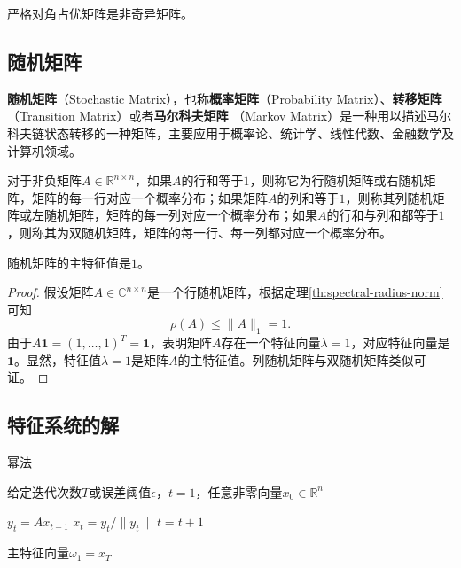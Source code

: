 \begin{theorem}
严格对角占优矩阵是非奇异矩阵。
\end{theorem}

\subsection{随机矩阵}
\textbf{随机矩阵}（Stochastic Matrix），也称\textbf{概率矩阵}（Probability Matrix）、\textbf{转移矩阵}（Transition Matrix）或者\textbf{马尔科夫矩阵}
（Markov Matrix）是一种用以描述马尔科夫链状态转移的一种矩阵，主要应用于概率论、统计学、线性代数、金融数学及计算机领域。

\begin{definition}[随机矩阵]
对于非负矩阵$A\in \mathbb R^{n\times n}$，如果$A$的行和等于$1$，则称它为行随机矩阵或右随机矩阵，矩阵的每一行对应一个概率分布；如果矩阵$A$的列和等于$1$，则称其列随机矩阵或左随机矩阵，矩阵的每一列对应一个概率分布；如果$A$的行和与列和都等于$1$，则称其为双随机矩阵，矩阵的每一行、每一列都对应一个概率分布。
\end{definition}

\begin{theorem}
随机矩阵的主特征值是$1$。
\end{theorem}
\begin{proof}
假设矩阵$A\in \mathbb C^{n\times n}$是一个行随机矩阵，根据定理\ref{th:spectral-radius-norm}可知
\[
    \rho(A) \le \|A\|_1 = 1.
\]
由于$A \mathbf 1 = (1,\ldots, 1)^T = \mathbf 1$，表明矩阵$A$存在一个特征向量$\lambda=1$，对应特征向量是$\mathbf 1$。显然，特征值$\lambda=1$是矩阵$A$的主特征值。列随机矩阵与双随机矩阵类似可证。
\end{proof}

\subsection{特征系统的解}
\begin{algorithm}[htbp]
\caption{幂法}
\begin{algorithmic}
\REQUIRE 给定迭代次数$T$或误差阈值$\epsilon$，$t=1$，任意非零向量$x_0 \in \mathbb R^n$

\STATE $y_t = A x_{t-1}$
\STATE $x_t = y_t/{\|y_t\|}$
\STATE $t = t+1$
\ENDWHILE

\ENSURE 主特征向量$\omega_1=x_T$
\end{algorithmic}
\end{algorithm}

